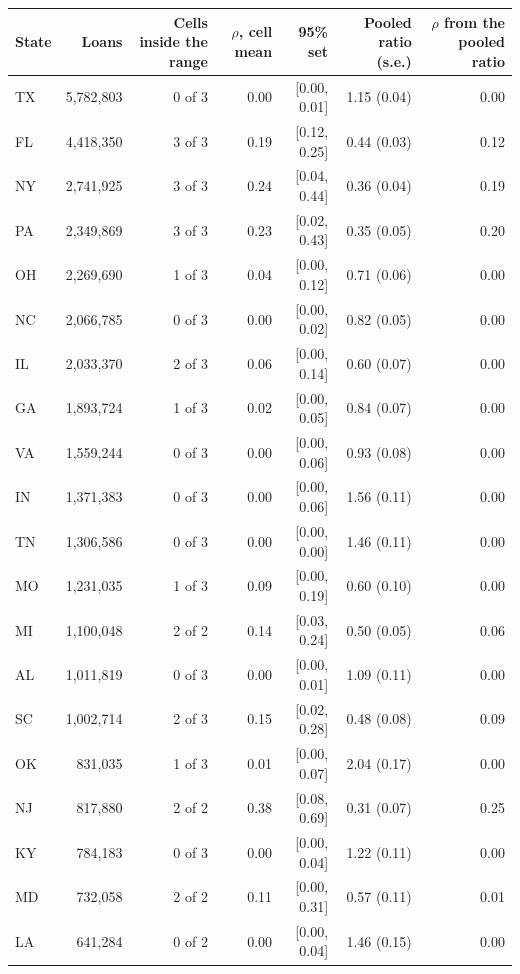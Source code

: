 \begin{tabular}{lrrrrrr}
\toprule
State & Loans & Cells inside the range & $\rho$, cell mean & 95\% set & Pooled ratio (s.e.) & $\rho$ from the pooled ratio \\
\midrule
TX & 5,782,803 & 0 of 3 & 0.00 & [0.00, 0.01] & 1.15 (0.04) & 0.00 \\
FL & 4,418,350 & 3 of 3 & 0.19 & [0.12, 0.25] & 0.44 (0.03) & 0.12 \\
NY & 2,741,925 & 3 of 3 & 0.24 & [0.04, 0.44] & 0.36 (0.04) & 0.19 \\
PA & 2,349,869 & 3 of 3 & 0.23 & [0.02, 0.43] & 0.35 (0.05) & 0.20 \\
OH & 2,269,690 & 1 of 3 & 0.04 & [0.00, 0.12] & 0.71 (0.06) & 0.00 \\
NC & 2,066,785 & 0 of 3 & 0.00 & [0.00, 0.02] & 0.82 (0.05) & 0.00 \\
IL & 2,033,370 & 2 of 3 & 0.06 & [0.00, 0.14] & 0.60 (0.07) & 0.00 \\
GA & 1,893,724 & 1 of 3 & 0.02 & [0.00, 0.05] & 0.84 (0.07) & 0.00 \\
VA & 1,559,244 & 0 of 3 & 0.00 & [0.00, 0.06] & 0.93 (0.08) & 0.00 \\
IN & 1,371,383 & 0 of 3 & 0.00 & [0.00, 0.06] & 1.56 (0.11) & 0.00 \\
TN & 1,306,586 & 0 of 3 & 0.00 & [0.00, 0.00] & 1.46 (0.11) & 0.00 \\
MO & 1,231,035 & 1 of 3 & 0.09 & [0.00, 0.19] & 0.60 (0.10) & 0.00 \\
MI & 1,100,048 & 2 of 2 & 0.14 & [0.03, 0.24] & 0.50 (0.05) & 0.06 \\
AL & 1,011,819 & 0 of 3 & 0.00 & [0.00, 0.01] & 1.09 (0.11) & 0.00 \\
SC & 1,002,714 & 2 of 3 & 0.15 & [0.02, 0.28] & 0.48 (0.08) & 0.09 \\
OK & 831,035 & 1 of 3 & 0.01 & [0.00, 0.07] & 2.04 (0.17) & 0.00 \\
NJ & 817,880 & 2 of 2 & 0.38 & [0.08, 0.69] & 0.31 (0.07) & 0.25 \\
KY & 784,183 & 0 of 3 & 0.00 & [0.00, 0.04] & 1.22 (0.11) & 0.00 \\
MD & 732,058 & 2 of 2 & 0.11 & [0.00, 0.31] & 0.57 (0.11) & 0.01 \\
LA & 641,284 & 0 of 2 & 0.00 & [0.00, 0.04] & 1.46 (0.15) & 0.00 \\
\bottomrule
\end{tabular}
